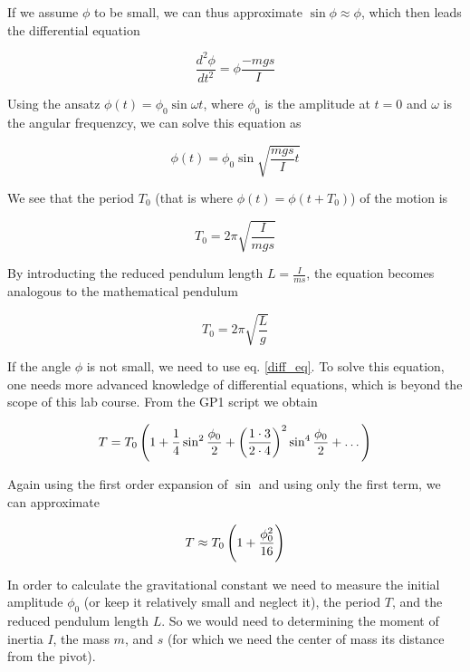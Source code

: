 \documentclass[a4paper,german,12pt,smallheadings]{scrartcl}
\begin{document}
If we assume $\phi$ to be small, we can thus approximate $\sin \phi \approx
\phi$, which then leads the differential equation

\begin{equation}
  \frac{d^2 \phi}{d t^2} = \phi \frac{-mgs}{I}
\end{equation}

Using the ansatz $\phi(t) = \phi_0 \sin \omega t$, where $\phi_0$ is the
amplitude at $t=0$ and $\omega$ is the angular frequenzcy, we can solve this
equation as

\begin{equation}
  \phi(t) = \phi_0 \sin \sqrt{\frac{mgs}{I} t}
\end{equation}

We see that the period $T_0$ (that is where $\phi(t) = \phi(t + T_0)$) of the motion is

\begin{equation}
  T_0 = 2 \pi \sqrt{\frac{I}{mgs}}
  \label{period}
\end{equation}

By introducting the reduced pendulum length $L = \frac{I}{ms}$, the
equation becomes analogous to the mathematical pendulum

\begin{equation}
  T_0 = 2 \pi \sqrt{\frac{L}{g}}
\end{equation}


If the angle $\phi$ is not small, we need to use eq. \ref{diff_eq}. To solve
this equation, one needs more advanced knowledge of differential equations,
which is beyond the scope of this lab course. From the GP1 script we obtain

\begin{equation}
  T = T_0 \del{1 + \frac{1}{4} \sin^2 \frac{\phi_0}{2} + \del{\frac{1 \cdot 3}{2 \cdot 4}}^2 \sin^4 \frac{\phi_0}{2} + \dots}
\end{equation}

Again using the first order expansion of $\sin$ and using only the first term, we can approximate

\begin{equation}
  T \approx T_0 \del{1 + \frac{\phi_0^2}{16}}
\end{equation}

In order to calculate the gravitational constant we need to measure the initial
amplitude $\phi_0$ (or keep it relatively small and neglect it), the period
$T$, and the reduced pendulum length $L$. So we would need to determining the
moment of inertia $I$, the mass $m$, and $s$ (for which we need the center of
mass its distance from the pivot).
\end{document}
